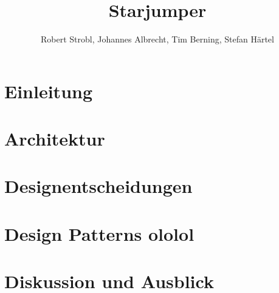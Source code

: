 


\title{Starjumper}
\author{Robert Strobl, Johannes Albrecht, Tim Berning, Stefan H\"artel}

\maketitle

\section{Einleitung}

\section{Architektur}

\section{Designentscheidungen}

\section{Design Patterns ololol}

\section{Diskussion und Ausblick}

